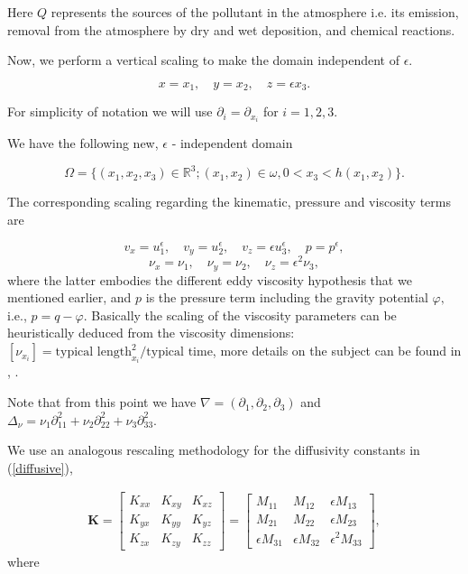 \documentclass[11pt]{article}
\begin{document}
Here $Q$ represents the sources of the pollutant in the atmosphere i.e. its emission, removal from the atmosphere by dry and wet deposition, and chemical reactions.

Now, we perform a vertical scaling to make the domain independent of $\epsilon.$

\[x=x_1, \quad y=x_2, \quad z=\epsilon x_3. \]

For simplicity of notation we will use $\partial_i = \partial_{x_i} $ for $i = 1,2,3.$

We have the following new, $\epsilon$ - independent domain

\[ \Omega = \{(x_1,x_2,x_3) \in \mathbb{R}^3 ; (x_1,x_2) \in \omega, 0 < x_3 < h (x_1 , x_2) \}.\]

The corresponding scaling regarding the kinematic, pressure and viscosity terms are

\[v_x = u_1^{\epsilon}, \quad v_y = u_2^{\epsilon}, \quad v_z = \epsilon u_3^{\epsilon}, \quad p = p^{\epsilon}, \]
\[\nu_x = \nu_1, \quad \nu_y = \nu_2 , \quad \nu_z = \epsilon ^ 2\nu_3, \]
%
where the latter embodies the different eddy viscosity hypothesis that we mentioned earlier, and $p$ is the pressure term including the gravity potential $\varphi,$ i.e., $p = q - \varphi$. Basically the scaling of the viscosity parameters can be heuristically deduced from the viscosity dimensions: $[\nu_{x_i}] = \text{typical length}_{x_i}^2 / \text{typical time}$, more details on the subject can be found in \cite{besson1992some}, \cite{azerad2001mathematical}.

Note that from this point we have $\nabla = (\partial_1, \partial_2, \partial_3) $ and $ \Delta_\nu = \nu_1 \partial^2_{11} + \nu_2 \partial^2_{22} + \nu_3 \partial^2_{33} $.

We use an analogous rescaling methodology for the diffusivity constants in (\ref{diffusive}),

\begin{gather}
\mathbf{K}
=
\begin{bmatrix} K_{xx} & K_{xy} & K_{xz} \\ K_{yx} & K_{yy} & K_{yz} \\ K_{zx} & K_{zy} & K_{zz} \end{bmatrix}
=
\begin{bmatrix}
M_{11} & M_{12} & \epsilon M_{13} \\ M_{21} & M_{22} & \epsilon M_{23} \\ \epsilon M_{31} & \epsilon M_{32} & \epsilon^2 M_{33}
\end{bmatrix},
\end{gather}
%
where
\end{document}
